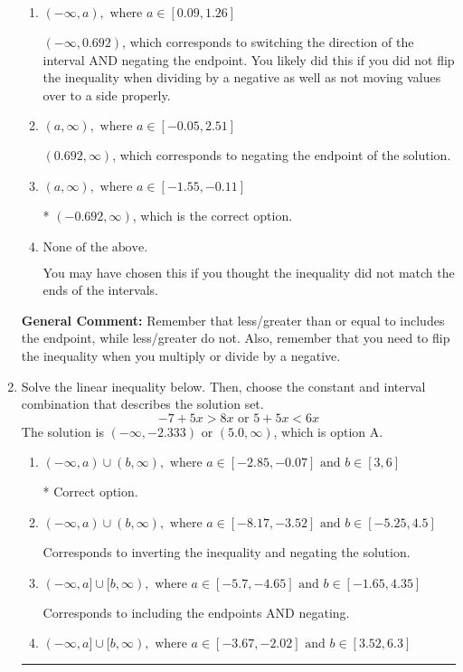 \documentclass{extbook}[14pt]
\newcommand{\litem}[1]{\item #1

\rule{\textwidth}{0.4pt}}
\begin{document}
\begin{enumerate}
{\begin{enumerate}[label=\Alph*.]
 $(-\infty, -0.692)$, which corresponds to switching the direction of the interval. You likely did this if you did not flip the inequality when dividing by a negative!
\item \( (-\infty, a), \text{ where } a \in [0.09, 1.26] \)

 $(-\infty, 0.692)$, which corresponds to switching the direction of the interval AND negating the endpoint. You likely did this if you did not flip the inequality when dividing by a negative as well as not moving values over to a side properly.
\item \( (a, \infty), \text{ where } a \in [-0.05, 2.51] \)

 $(0.692, \infty)$, which corresponds to negating the endpoint of the solution.
\item \( (a, \infty), \text{ where } a \in [-1.55, -0.11] \)

* $(-0.692, \infty)$, which is the correct option.
\item \( \text{None of the above}. \)

You may have chosen this if you thought the inequality did not match the ends of the intervals.
\end{enumerate}

\textbf{General Comment:} Remember that less/greater than or equal to includes the endpoint, while less/greater do not. Also, remember that you need to flip the inequality when you multiply or divide by a negative.
}
\litem{
Solve the linear inequality below. Then, choose the constant and interval combination that describes the solution set.
\[ -7 + 5 x > 8 x \text{ or } 5 + 5 x < 6 x \]The solution is \( (-\infty, -2.333) \text{ or } (5.0, \infty) \), which is option A.\begin{enumerate}[label=\Alph*.]
\item \( (-\infty, a) \cup (b, \infty), \text{ where } a \in [-2.85, -0.07] \text{ and } b \in [3, 6] \)

 * Correct option.
\item \( (-\infty, a) \cup (b, \infty), \text{ where } a \in [-8.17, -3.52] \text{ and } b \in [-5.25, 4.5] \)

Corresponds to inverting the inequality and negating the solution.
\item \( (-\infty, a] \cup [b, \infty), \text{ where } a \in [-5.7, -4.65] \text{ and } b \in [-1.65, 4.35] \)

Corresponds to including the endpoints AND negating.
\item \( (-\infty, a] \cup [b, \infty), \text{ where } a \in [-3.67, -2.02] \text{ and } b \in [3.52, 6.3] \)


\end{enumerate}}
\end{enumerate}
\end{document}
